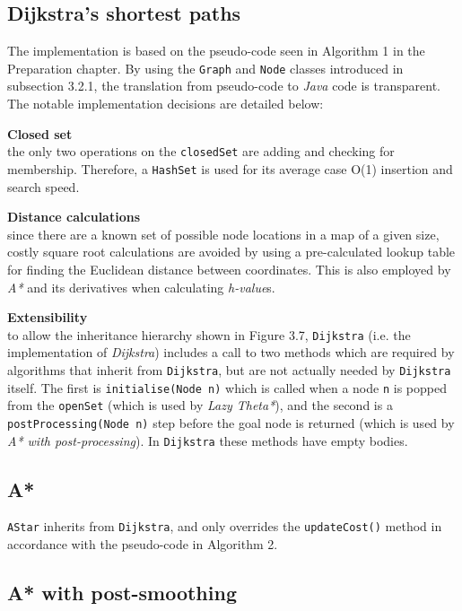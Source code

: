 \documentclass[12pt,notitlepage]{report}
\begin{document}
\subsection{Dijkstra's shortest paths}
The implementation is based on the pseudo-code seen in Algorithm 1 in the Preparation chapter. By using the {\tt Graph} and {\tt Node} classes introduced in subsection 3.2.1, the translation from pseudo-code to {\em Java} code is transparent. The notable implementation decisions are detailed below:
\begin{description}
  \item {\bf Closed set}\\ \hfill
  the only two operations on the {\tt closedSet} are adding and checking for membership. Therefore, a {\tt HashSet} is used for its average case O(1) insertion and search speed.
  \item {\bf Distance calculations}\\ \hfill
  since there are a known set of possible node locations in a map of a given size, costly square root calculations are avoided by using a pre-calculated lookup table for finding the Euclidean distance between coordinates. This is also employed by {\em A*} and its derivatives when calculating {\em h-value}s.
  \item {\bf Extensibility} \\ \hfill
  to allow the inheritance hierarchy shown in Figure 3.7, {\tt Dijkstra} (i.e. the implementation of {\em Dijkstra}) includes a call to two methods which are required by algorithms that inherit from {\tt Dijkstra}, but are not actually needed by {\tt Dijkstra} itself. The first is {\tt initialise(Node n)} which is called when a node {\tt n} is popped from the {\tt openSet} (which is used by {\em Lazy Theta*}), and the second is a {\tt postProcessing(Node n)} step before the goal node is returned (which is used by {\em A* with post-processing}). In {\tt Dijkstra}  these methods have empty bodies.
  \end{description}

\subsection{A*}
{\tt AStar} inherits from {\tt Dijkstra}, and only overrides the {\tt updateCost()} method in accordance with the pseudo-code in Algorithm 2.

\subsection{A* with post-smoothing}
\end{document}
